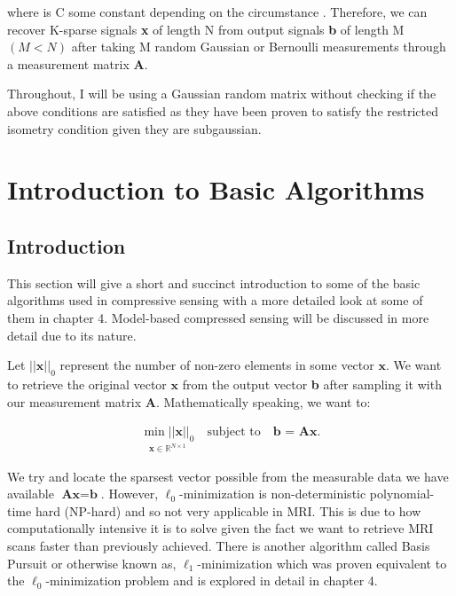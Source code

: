\documentclass[titlepage,oneside, 12pt]{book}
\theoremstyle{break}
\begin{document}
where is C some constant depending on the circumstance \cite{CSDon}\cite{RBUC}. Therefore, we can recover K-sparse signals \textbf{x} of length N from output signals \textbf{b} of length M $(M < N)$ after taking  M random Gaussian or Bernoulli measurements through a measurement matrix \textbf{A}. 

Throughout, I will be using a Gaussian random matrix without checking if the above conditions are satisfied as they have been proven to satisfy the restricted isometry condition given they are subgaussian. 

\newpage



\chapter{Introduction to Basic Algorithms}
\section{Introduction}

This section will give a short and succinct introduction to some of the basic algorithms used in compressive sensing with a more detailed look at some of them in chapter 4. Model-based compressed sensing will be discussed in more detail due to its nature. 

Let $||\textbf{x}||_0$ represent the number of non-zero elements in some vector $\textbf{x}$. We want to retrieve the original vector $\textbf{x}$ from the output vector \textbf{b} after sampling it with our measurement matrix \textbf{A}. Mathematically speaking, we want to:

\begin{equation}
\begin{gathered}
\underset{\textbf{x} \in \mathbb{R}^{N \times 1}}{\min ||\textbf{x}||_{0}} \quad
\text{subject to} \quad \textbf{b = Ax}.
\end{gathered}
\end{equation}

We try and locate the sparsest vector possible from the measurable data we have available $\textbf{Ax} = \textbf{b}$. However, $\ell_0$-minimization is non-deterministic polynomial-time hard (NP-hard) and so not very applicable in MRI. This is due to how computationally intensive it is to solve given the fact we want to retrieve MRI scans faster than previously achieved. There is another algorithm called Basis Pursuit or otherwise known as, $\ell_{1}$-minimization which was proven equivalent\cite{delin} to the $\ell_{0}$-minimization problem and is explored in detail in chapter 4. 
\end{document}
